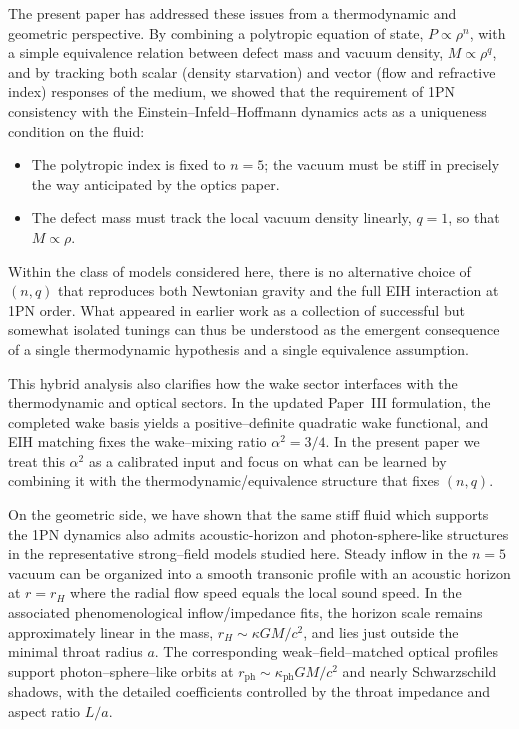 \documentclass[11pt]{article}
\begin{document}
The present paper has addressed these issues from a thermodynamic and
geometric perspective.  By combining a polytropic equation of state,
\(P \propto \rho^n\), with a simple equivalence relation between defect mass
and vacuum density, \(M \propto \rho^q\), and by tracking both scalar
(density starvation) and vector (flow and refractive index) responses of the
medium, we showed that the requirement of 1PN consistency with the
Einstein--Infeld--Hoffmann dynamics acts as a uniqueness condition on the
fluid:
\begin{itemize}
  \item The polytropic index is fixed to \(n = 5\); the vacuum must be
        stiff in precisely the way anticipated by the optics paper.
  \item The defect mass must track the local vacuum density linearly,
        \(q = 1\), so that \(M \propto \rho\).
\end{itemize}
Within the class of models considered here, there is no alternative choice
of \((n,q)\) that reproduces both Newtonian gravity and the full EIH
interaction at 1PN order.  What appeared in earlier work as a collection of
successful but somewhat isolated tunings can thus be understood as the
emergent consequence of a single thermodynamic hypothesis and a single
equivalence assumption.

This hybrid analysis also clarifies how the wake sector interfaces with the
thermodynamic and optical sectors.  In the updated Paper~III formulation, the
completed wake basis yields a positive--definite quadratic wake functional,
and EIH matching fixes the wake--mixing ratio \(\alpha^2=3/4\).  In the
present paper we treat this \(\alpha^2\) as a calibrated input and focus on
what can be learned by combining it with the thermodynamic/equivalence
structure that fixes \((n,q)\).

On the geometric side, we have shown that the same stiff fluid which
supports the 1PN dynamics also admits acoustic-horizon and photon-sphere-like
structures in the representative strong--field models studied here.  Steady
inflow in the \(n=5\) vacuum can be organized into a smooth transonic
profile with an acoustic horizon at \(r = r_H\) where the radial flow speed
equals the local sound speed.  In the associated phenomenological
inflow/impedance fits, the horizon scale remains approximately linear in the
mass, \(r_H \sim \kappa G M / c^2\), and lies just outside the minimal
throat radius \(a\).  The corresponding weak--field--matched optical
profiles support photon--sphere--like orbits at
\(r_{\text{ph}} \sim \kappa_{\text{ph}} G M / c^2\) and nearly
Schwarzschild shadows, with the detailed coefficients controlled by the
throat impedance and aspect ratio \(L/a\).
\end{document}

